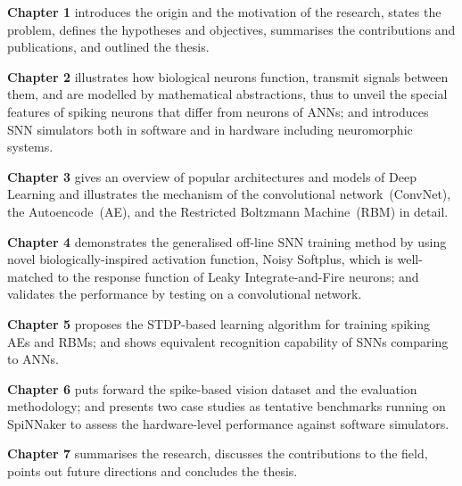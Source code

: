 \textbf{Chapter 1} introduces the origin and the motivation of the research, states the problem, defines the hypotheses and objectives, summarises the contributions and publications, and outlined the thesis. 

\textbf{Chapter 2} %
illustrates how biological neurons function, transmit signals between them, and are modelled by mathematical abstractions, thus to unveil the special features of spiking neurons that differ from neurons of ANNs; and introduces SNN simulators both in software and in hardware including neuromorphic systems.

\textbf{Chapter 3} gives an overview of popular architectures and models of Deep Learning and illustrates the mechanism of the convolutional network~(ConvNet), the Autoencode~(AE), and the Restricted Boltzmann Machine~(RBM) in detail.

\textbf{Chapter 4} demonstrates the generalised off-line SNN training method by using novel biologically-inspired activation function, Noisy Softplus, which is well-matched to the response function of Leaky Integrate-and-Fire neurons; and validates the performance by testing on a convolutional network.

\textbf{Chapter 5} proposes the STDP-based learning algorithm for training spiking AEs and RBMs; and shows equivalent recognition capability of SNNs comparing to ANNs.

\textbf{Chapter 6} puts forward the spike-based vision dataset and the evaluation methodology; and presents two case studies as tentative benchmarks running on SpiNNaker to assess the hardware-level performance against software simulators.

\textbf{Chapter 7} summarises the research, discusses the contributions to the field, points out future directions and concludes the thesis.



